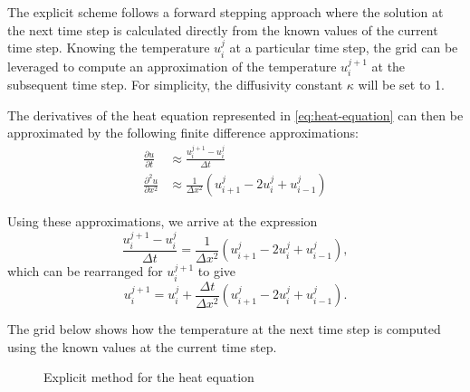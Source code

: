 The explicit scheme follows a forward stepping approach where the solution at the next time step is calculated directly from
the known values of the current time step. Knowing the temperature $u_i^j$ at a particular time step, the grid can be leveraged to compute an
approximation of the temperature $u_i^{j+1}$ at the subsequent time step. For simplicity, the diffusivity constant $\kappa$ will be set to 1.

The derivatives of the heat equation represented in \eqref{eq:heat-equation} can then be approximated by the following finite difference approximations:
\begin{align}
    \frac{\partial u}{\partial t} &\approx \frac{u_i^{j+1} - u_i^{j}}{\Delta t} \tag{Time Derivative} \\
    \frac{\partial^2 u}{\partial x^2} &\approx \frac {1}{\Delta x^2} (u_{i+1}^j - 2u_i^j + u_{i-1}^j) \tag{Spatial Second Derivative}
\end{align}

Using these approximations, we arrive at the expression
\begin{equation}
    \frac{u_i^{j+1} - u_i^{j}}{\Delta t} = \frac {1}{\Delta x^2} (u_{i+1}^j - 2u_i^j + u_{i-1}^j),
\end{equation}
which can be rearranged for $u_i^{j+1}$ to give
\begin{equation}
    u_i^{j+1} = u_i^{j} + \frac {\Delta t}{\Delta x^2} (u_{i+1}^j - 2u_i^j + u_{i-1}^j).
\end{equation}

The grid below shows how the temperature at the next time step is computed using the known values at the current time step.
\begin{figure}[H]
    \centering
    \caption{Explicit method for the heat equation}
    \label{fig:heat-explicit}
\end{figure}

